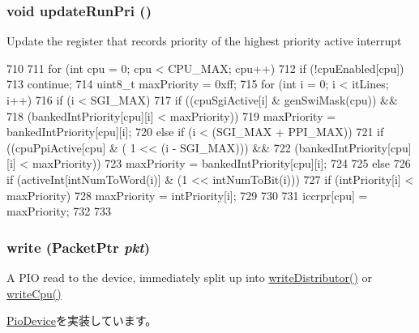 \hypertarget{classPl390_a036668b76c53cab82ed983b838667b23}{
\subsubsection[{updateRunPri}]{\setlength{\rightskip}{0pt plus 5cm}void updateRunPri ()}}
\label{classPl390_a036668b76c53cab82ed983b838667b23}
Update the register that records priority of the highest priority active interrupt 


\begin{DoxyCode}
710 {
711     for (int cpu = 0; cpu < CPU_MAX; cpu++) {
712         if (!cpuEnabled[cpu])
713             continue;
714         uint8_t maxPriority = 0xff;
715         for (int i = 0; i < itLines; i++){
716             if (i < SGI_MAX) {
717                 if ((cpuSgiActive[i] & genSwiMask(cpu)) &&
718                         (bankedIntPriority[cpu][i] < maxPriority))
719                     maxPriority = bankedIntPriority[cpu][i];
720             } else if (i < (SGI_MAX + PPI_MAX)) {
721                 if ((cpuPpiActive[cpu] & ( 1 << (i - SGI_MAX))) &&
722                         (bankedIntPriority[cpu][i] < maxPriority))
723                     maxPriority = bankedIntPriority[cpu][i];
724 
725             } else {
726                 if (activeInt[intNumToWord(i)] & (1 << intNumToBit(i)))
727                     if (intPriority[i] < maxPriority)
728                         maxPriority = intPriority[i];
729             }
730         }
731         iccrpr[cpu] = maxPriority;
732     }
733 }
\end{DoxyCode}
\hypertarget{classPl390_a4cefab464e72b5dd42c003a0a4341802}{
\subsubsection[{write}]{ write ({\bf PacketPtr} {\em pkt})}}
\label{classPl390_a4cefab464e72b5dd42c003a0a4341802}
A PIO read to the device, immediately split up into \hyperlink{classPl390_aa2bced1a2b305cd5aa2e0f9fed1e1e2b}{writeDistributor()} or \hyperlink{classPl390_a1a1ae570cfae6908672073193a14ef6a}{writeCpu()} 

\hyperlink{classPioDevice_afe8371668d023bb2516b286e5e399b6f}{PioDevice}を実装しています。


